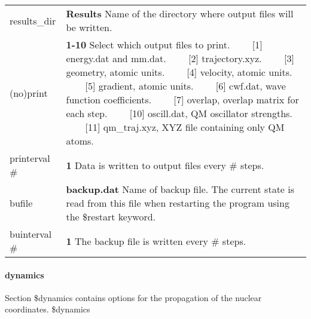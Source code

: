 \documentclass{report}
\newcommand{\tabitem}{~~\llap{--}~~}
\begin{document}
\begin{tabularx}{\textwidth}{ m{2.5cm} X }
results\_dir &
	\textbf{Results} \newline
	Name of the directory where output files will be written. \\

(no)print		&
	\textbf{1-10} \newline
	Select which output files to print. \newline
	\tabitem [1]   energy.dat and mm.dat. \newline
	\tabitem [2]   trajectory.xyz. \newline
	\tabitem [3]   geometry, atomic units. \newline
	\tabitem [4]   velocity, atomic units. \newline
	\tabitem [5]   gradient, atomic units. \newline
	\tabitem [6]   cwf.dat, wave function coefficients. \newline
	\tabitem [7]   overlap, overlap matrix for each step. \newline
	\tabitem [10]  oscill.dat, QM oscillator strengths. \newline
	\tabitem [11]  qm\_traj.xyz, XYZ file containing only QM atoms. \\

printerval \#	&
	\textbf{1} \newline
	Data is written to output files every \# steps. \\

bufile			&
	\textbf{backup.dat} \newline
	Name of backup file. The current state is read from this file when restarting the program using the \$restart keyword. \\
	
buinterval \#	&
	\textbf{1} \newline
	The backup file is written every \# steps. \\
\end{tabularx}


\paragraph{dynamics}
Section \$dynamics contains options for the propagation of the nuclear coordinates. \newline
\$dynamics
\end{document}
